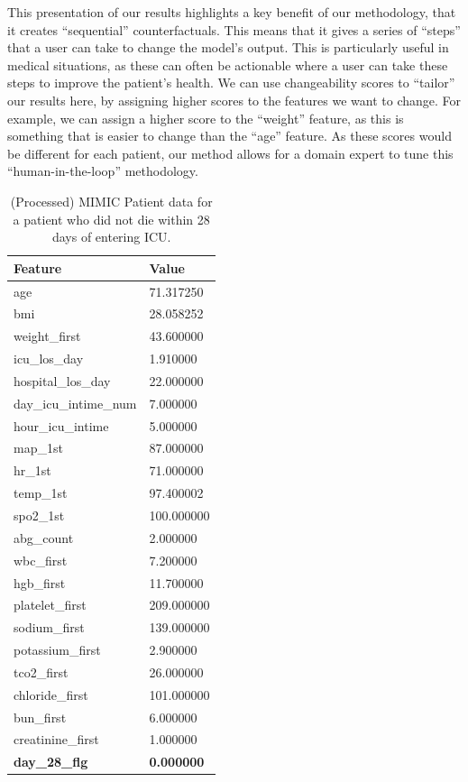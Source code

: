 \documentclass{article}
\begin{document}
This presentation of our results highlights a key benefit of our methodology, that it creates ``sequential'' counterfactuals. This means that it gives a series of ``steps'' that a user can take to change the model's output. This is particularly useful in medical situations, as these can often be actionable where a user can take these steps to improve the patient's health. We can use changeability scores to ``tailor'' our results here, by assigning higher scores to the features we want to change. For example, we can assign a higher score to the ``weight'' feature, as this is something that is easier to change than the ``age'' feature. As these scores would be different for each patient, our method allows for a domain expert to tune this ``human-in-the-loop'' methodology.

\begin{table}[]
    \centering
    \begin{tabular}{@{}ll@{}}
    \toprule
    \textbf{Feature}      & \textbf{Value}    \\ \midrule
    age                   & 71.317250         \\
    bmi                   & 28.058252         \\
    weight\_first         & 43.600000         \\
    icu\_los\_day         & 1.910000          \\
    hospital\_los\_day    & 22.000000         \\
    day\_icu\_intime\_num & 7.000000          \\
    hour\_icu\_intime     & 5.000000          \\
    map\_1st              & 87.000000         \\
    hr\_1st               & 71.000000         \\
    temp\_1st             & 97.400002         \\
    spo2\_1st             & 100.000000        \\
    abg\_count            & 2.000000          \\
    wbc\_first            & 7.200000          \\
    hgb\_first            & 11.700000         \\
    platelet\_first       & 209.000000        \\
    sodium\_first         & 139.000000        \\
    potassium\_first      & 2.900000          \\
    tco2\_first           & 26.000000         \\
    chloride\_first       & 101.000000        \\
    bun\_first            & 6.000000          \\
    creatinine\_first     & 1.000000          \\ \midrule
    \textbf{day\_28\_flg} & \textbf{0.000000} \\ \bottomrule
    \end{tabular}
    \caption{(Processed) MIMIC Patient data for a patient who did not die within 28 days of entering ICU.\label{table:mimic_patient}}
\end{table}
\end{document}
